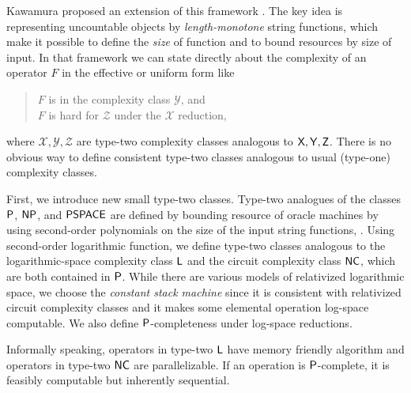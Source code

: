 \documentclass{article}
\theoremstyle{definition}
\theoremstyle{remark}
\begin{document}
Kawamura proposed an extension of this framework \cite{kawamura2012complexity}.
The key idea is representing uncountable 
objects by \emph{length-monotone} string functions, which make it possible to define the
\emph{size} of function and to bound resources by size of input.
In that framework we can state directly about the complexity of
 an operator $F$ in the effective or uniform form like
\begin{quote}
 $F$ is in the complexity class $\mathcal Y$, and \\
 $F$ is hard for $\mathcal Z$ under the $\mathcal X$ reduction,
\end{quote}
where $\mathcal{X, Y, Z}$ are type-two complexity classes analogous to $\mathsf{X, Y, Z}$.
There is no obvious way to define consistent type-two classes 
analogous to usual (type-one) complexity classes.

First, we introduce new small type-two classes.
Type-two analogues of the classes $\mathsf{P}$, $\mathsf{NP}$, and $\mathsf{PSPACE}$
are defined by bounding resource of oracle machines by using 
second-order polynomials on the size of the input string functions,
\cite{kawamura2012complexity}.
Using second-order logarithmic function,
we define type-two classes analogous to the logarithmic-space 
complexity class $\mathsf{L}$ and the circuit complexity class $\mathsf{NC}$, 
which are both contained in $\mathsf{P}$.
While there are various models of relativized logarithmic space,
we choose the \emph{constant stack machine} \cite{aehlig2007relativizing} 
since it is consistent with relativized circuit complexity classes 
and it makes some elemental operation log-space computable.
We also define $\mathsf{P}$-completeness under log-space reductions.

Informally speaking, operators in type-two $\mathsf{L}$ have
memory friendly algorithm and operators in type-two $\mathsf{NC}$
are parallelizable.
If an operation is $\mathsf{P}$-complete,
it is feasibly computable but inherently sequential. 
\end{document}

